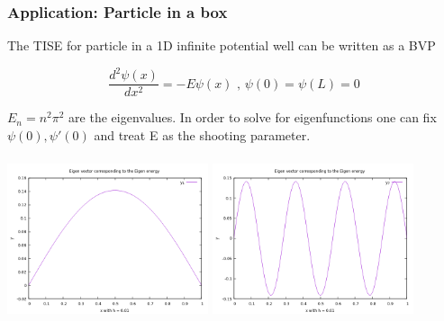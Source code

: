 \documentclass{beamer}
\begin{document}
\begin{frame}
	\frametitle{Application: Particle in a box}
	
	The TISE for particle in a 1D infinite potential well can be written as a BVP 
	
	\begin{equation}
	\frac{d^2 \psi(x)}{d x^2} = - E \psi(x) \text{     ,    } \psi(0) = \psi(L) = 0   
	\end{equation}

     $ E_n  = n^2 \pi^2 $ are the eigenvalues. In order to solve for eigenfunctions one can fix $\psi(0), \psi'(0)$ and treat E as the shooting parameter.
	
	\begin{center}
		\includegraphics[width = 5.9cm , height = 4.8cm ]{5.png}
		\includegraphics[width = 5.9cm , height = 4.8cm ]{8.png}
	\end{center}
		
\end{frame}
\end{document}
